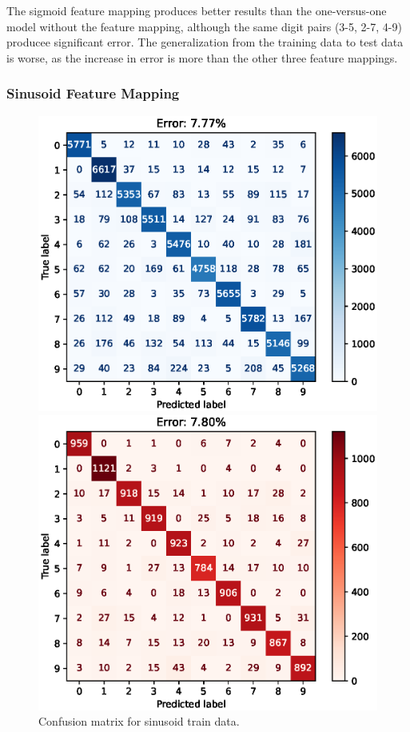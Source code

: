 \documentclass{article}
\begin{document}
The sigmoid feature mapping produces better results than the one-versus-one model without the feature mapping, although the same digit pairs (3-5, 2-7, 4-9) producee significant error.
The generalization from the training data to test data is worse, as the increase in error is more than the other three feature mappings.

\FloatBarrier
\subsubsection{Sinusoid Feature Mapping}
\begin{figure}[h!]
    \centering
    \begin{minipage}{0.5\textwidth}
        \centering
        \includegraphics[width=\textwidth]{images/one_vs_all_training_confusion_matrix_Sine.eps}
        \caption{Confusion matrix for sinusoid train data.}
    \end{minipage}\hfill
    \begin{minipage}{0.5\textwidth}
        \centering
        \includegraphics[width=\textwidth]{images/one_vs_all_test_confusion_matrix_Sine.eps}

\end{minipage}
\end{figure}
\end{document}
